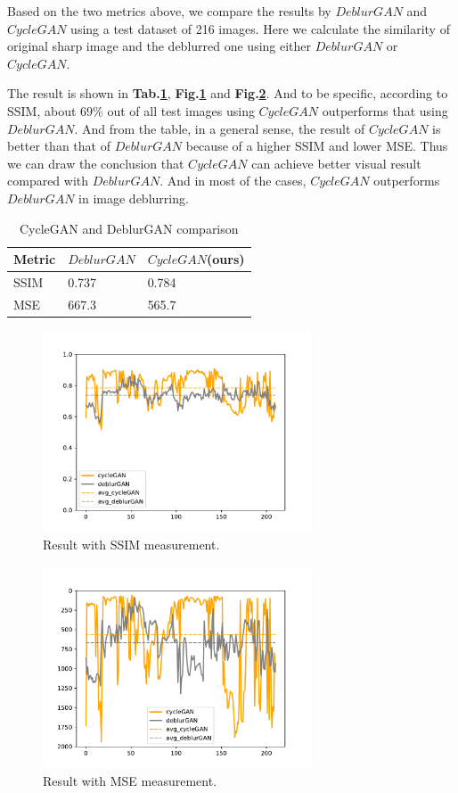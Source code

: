 \documentclass[journal]{IEEEtran}
\begin{document}
Based on the two metrics above, we compare the results by $DeblurGAN$ and $CycleGAN$ using a test dataset of 216 images. Here we calculate the similarity of original sharp image and the deblurred one using either $DeblurGAN$ or $CycleGAN$. 

The result is shown in \textbf{Tab.\ref{com_res}}, \textbf{Fig.\ref{res_ssim}} and \textbf{Fig.\ref{res_mse}}. And to be specific, according to SSIM, about $69\%$ out of all test images using $CycleGAN$ outperforms that using $DeblurGAN$. And from the table, in a general sense, the result of $CycleGAN$ is better than that of $DeblurGAN$ because of a higher SSIM and lower MSE. Thus we can draw the conclusion that $CycleGAN$ can achieve better visual result compared with $DeblurGAN$. And in most of the cases, $CycleGAN$ outperforms $DeblurGAN$ in image deblurring.

\begin{table}  
	\caption{CycleGAN and DeblurGAN comparison}
	\label{com_res}  
	\begin{center}  
		\begin{tabular}{l|l|l}  
			\hline  
			Metric & $DeblurGAN$ & $CycleGAN$(ours)   \\
			\hline
			SSIM & 0.737  & 0.784 \\
			MSE & 667.3 & 565.7 \\
			\hline  
		\end{tabular}  
	\end{center}  
\end{table}  

\begin{figure}[htbp]
	\centering
	\includegraphics[width=8cm]{fig/Figure_ssim.pdf}
	\caption{Result with SSIM measurement.}
	\label{res_ssim}
\end{figure}
\begin{figure}[htbp]
	\centering
	\includegraphics[width=8cm]{fig/Figure_mse.pdf}
	\caption{Result with MSE measurement.}
	\label{res_mse}
\end{figure}
\end{document}
